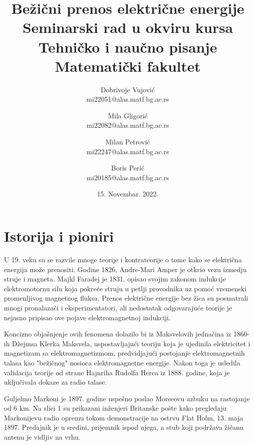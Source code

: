 \documentclass[a4paper]{article}
\begin{document}
	\title{Bežični prenos električne energije\\ \small{Seminarski rad u okviru kursa\\Tehničko i naučno pisanje\\ Matematički fakultet}}
	
	\author{Dobrivoje Vujović \\mi22051@alas.matf.bg.ac.rs 
			\and Mila Gligorić \\mi22082@alas.matf.bg.ac.rs
			\and Milan Petrović \\mi22247@alas.matf.bg.ac.rs
			\and Boris Perić\\mi20185@alas.matf.bg.ac.rs}

	\date{15. Novembar. 2022.}
	\maketitle

\tableofcontents
\newpage

\section{Istorija i pioniri}

U 19. veku su se razvile mnoge teorije i kontrateorije o tome kako se električna energija može prenositi. Godine 1826, Andre-Mari Amper je otkrio vezu izmedju struje i magneta. Majkl Faradej je 1831. opisao svojim zakonom indukcije elektromotornu silu koja pokreće struju u petlji provodnika uz pomoć vremenski promenljivog magnetnog fluksa. Prenos električne energije bez žica su posmatrali mnogi pronalazači i eksperimentatori, ali nedostatak odgovarajuće teorije je nejasno pripisao ove pojave elektromagnetnoj indukciji.

Koncizno objašnjenje ovih fenomena dolazilo bi iz Maksvelovih jednačina iz 1860-ih Džejmsa Klerka Maksvela, uspostavljajući teoriju koja je ujedinila elektricitet i magnetizam sa elektromagnetizmom, predvidjajući postojanje elektromagnetnih talasa kao "bežičnog" nosioca elektromagnetne energije.
Nakon toga je usledila validacija teorije od strane Hajnriha Rudolfa Herca iz 1888. godine, koja je uključivala dokaze za radio talase.

Guljelmo Markoni je 1897. godine uspešno poslao Morseovu azbuku na rastojanje od 6 km.
Na slici 1 su prikazani inženjeri Britanske pošte kako pregledaju Markonijevu radio opremu tokom demonstracije na ostrvu Flat Holm, 13. maja 1897. Predajnik je u sredini, prijemnik ispod njega, a stub koji podržava žičanu antenu je vidljiv na vrhu.
\end{document}
